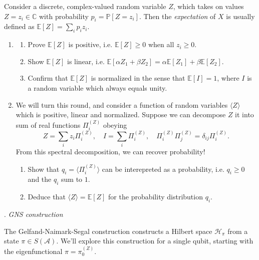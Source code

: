 \noindent Consider a discrete, complex-valued random variable $Z$, which takes on values
$Z = z_i \in \mathbb{C}$ with probability $p_i = \mathbb{P}[Z =
z_i]$. Then the \emph{expectation} of $X$ is usually defined as
$\mathbb{E}[Z] = \sum_i p_i z_i$.
\begin{enumerate}[label=(\alph*), itemsep=-1pt]
  \item \begin{enumerate}[label=\roman*., itemsep=-1pt] 
    \item  Prove $\mathbb{E}[Z]$ is positive, i.e. $\mathbb{E}[Z] \geq 0$ when all $z_i \geq 0$.
    \item Show $\mathbb{E}[Z]$ is linear, i.e. $\mathbb{E}[\alpha Z_1 +
      \beta Z_2] = \alpha \mathbb{E}[Z_1]+\beta \mathbb{E}[Z_2]$.
      \item Confirm that $\mathbb{E}[Z]$ is normalized in the sense
        that $\mathbb{E}[I] = 1$, where $I$ is a random variable which
        always equals unity.
                \end{enumerate}
  \item We will turn this round, and consider a function of random
    variables $\langle Z\rangle$ which is positive, linear and
    normalized.
    Suppose we can decompose $Z$ it into sum of real functions $\Pi_i^{(Z)}$ obeying %
      \[
       Z = \sum_{i} z_i \Pi_i^{(Z)}, \quad I = \sum_{i} \Pi_i^{(Z)},
       \quad  \Pi_i^{(Z)} \Pi_j^{(Z)} = \delta_{ij}\Pi_i^{(Z)}.
   \]
   From this spectral decomposition, we can recover probability!
    \begin{enumerate}[label=\roman*., itemsep=-1pt] 
    \item Show that $q_i = \langle \Pi_i^{(Z)}\rangle$ can be
      interepreted as a probability, i.e. $q_i \geq 0$ and the $q_i$
      sum to $1$.
    \item Deduce that $\langle Z\rangle = \mathbb{E}[Z]$ for the
      probability distribution $q_i$.
                \end{enumerate}
  \end{enumerate}
  
\vspace{5pt}
\begin{Large}
  . \emph{GNS construction} 
\end{Large}
\vspace{5pt}

\noindent The Gelfand-Naimark-Segal construction constructs a Hilbert
space $\mathcal{H}_\pi$ from a state $\pi \in S(\mathcal{A})$. We'll
explore this construction for a single qubit, starting with the eigenfunctional
$\pi = \pi^{(Z)}_0$.

